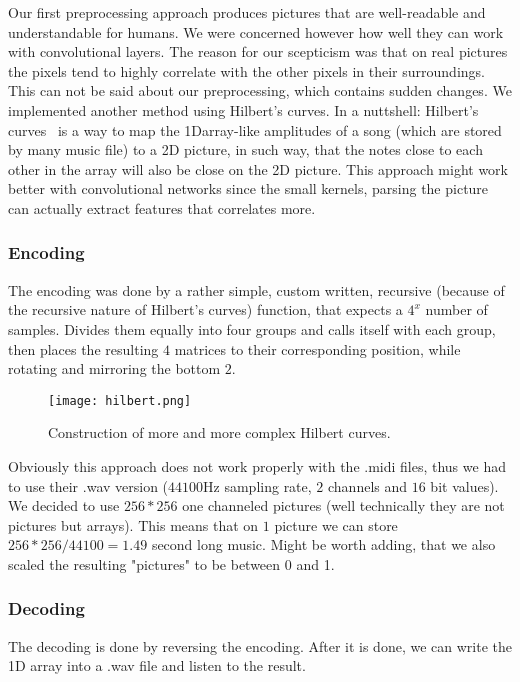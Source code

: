 Our first preprocessing approach produces pictures that are well-readable and understandable for humans. We were concerned however how well they can work with convolutional layers. The reason for our scepticism was that on real pictures the pixels tend to highly correlate with the other pixels in their surroundings. This can not be said about our preprocessing, which contains sudden changes. We implemented another method using Hilbert’s curves. In a nuttshell: Hilbert’s curves~\cite{hilbert} is a way to map the 1Darray-like amplitudes of a song (which are stored by many music file) to a 2D picture, in such way, that the notes close to each other in the array will also be close on the 2D picture. This approach might work better with convolutional networks since the small kernels, parsing the picture can actually extract features that correlates more.

\subsubsection{Encoding}
The encoding was done by a rather simple, custom written, recursive (because of the recursive nature of Hilbert's curves) function, that expects a $4^x$ number of samples. Divides them equally into four groups and calls itself with each group, then places the resulting  $4$ matrices to their corresponding position, while rotating and mirroring the bottom $2$.

\begin{figure}[H]
	\centering
	\texttt{[image: hilbert.png]}
	\caption{Construction of more and more complex Hilbert curves.}
	\label{fig:hilbert}
\end{figure}

Obviously this approach does not work properly with the .midi files, thus we had to use their .wav version ($44100$Hz sampling rate, $2$ channels and $16$ bit values). We decided to use $256*256$ one channeled pictures (well technically they are not pictures but arrays). This means that on $1$ picture we can store $256*256/44100 = 1.49$ second long music. Might be worth adding, that we also scaled the resulting "pictures" to be between 0 and 1.

\subsubsection{Decoding}
The decoding is done by reversing the encoding. After it is done, we can write the 1D array into a .wav file and listen to the result.